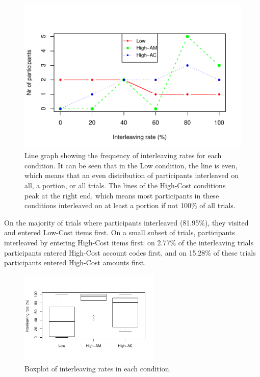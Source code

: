 \begin{figure}
 \includegraphics[width=\textwidth]{images/ch34/ch34-5_linechart.pdf}
\caption[Study 5 frequency of interleaving rates]{Line graph showing the frequency of interleaving rates for each condition. It can be seen that in the Low condition, the line is even, which means that an even distribution of participants interleaved on all, a portion, or all trials. The lines of the High-Cost conditions peak at the right end, which means most participants in these conditions interleaved on at least a portion if not 100\% of all trials.}
\label{fig:ch34_5-linechart}
\end{figure}

On the majority of trials where participants interleaved (81.95\%), they visited and entered Low-Cost items first. On a small subset of trials, participants interleaved by entering High-Cost items first: on 2.77\% of the interleaving trials participants entered High-Cost account codes first, and on 15.28\% of these trials participants entered High-Cost amounts first. 

\begin{figure}
 \includegraphics[width=0.6\textwidth]{images/ch34/ch4_5-boxplot.pdf}
\caption[Study 5 boxplot of interleaving rates]{Boxplot of interleaving rates in each condition.}
\label{fig:ch34_5-boxplots}
\end{figure}

